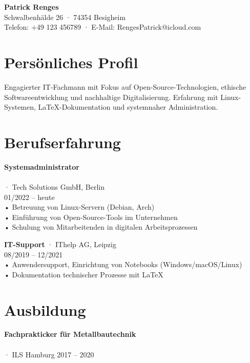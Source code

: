 \documentclass[12pt,a4paper]{article}
\begin{document}
\begin{center}
  {\LARGE \textbf{Patrick Renges}}\\[2pt]
  Schwalbenhälde 26 · 74354 Besigheim\\
  Telefon: +49 123 456789 · E-Mail: RengesPatrick@icloud.com
\end{center}

\vspace{1em}

\section*{Persönliches Profil}

Engagierter IT-Fachmann mit Fokus auf Open-Source-Technologien, ethische Softwareentwicklung und nachhaltige Digitalisierung. Erfahrung mit Linux-Systemen, LaTeX-Dokumentation und systemnaher Administration.

\section*{Berufserfahrung}

\textbf{Systemadministrator} \\
\\
· Tech Solutions GmbH, Berlin\\
01/2022 – heute\\
• Betreuung von Linux-Servern (Debian, Arch)\\
• Einführung von Open-Source-Tools im Unternehmen\\
• Schulung von Mitarbeitenden in digitalen Arbeitsprozessen

\vspace{0.5em}
\textbf{IT-Support} · IThelp AG, Leipzig\\
08/2019 – 12/2021\\
• Anwendersupport, Einrichtung von Notebooks (Windows/macOS/Linux)\\
• Dokumentation technischer Prozesse mit LaTeX

\section*{Ausbildung}

\textbf{Fachprakticker für Metallbautechnik} \\
\\
· ILS Hamburg
2017 – 2020
\end{document}
